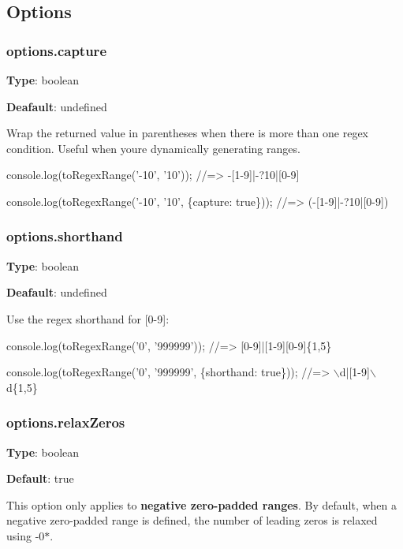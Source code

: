 \subsection*{Options}

\subsubsection*{options.\+capture}

{\bfseries Type}\+: {\ttfamily boolean}

{\bfseries Deafault}\+: {\ttfamily undefined}

Wrap the returned value in parentheses when there is more than one regex condition. Useful when you\textquotesingle{}re dynamically generating ranges.


\begin{DoxyCode}
console.log(toRegexRange('-10', '10'));
//=> -[1-9]|-?10|[0-9]

console.log(toRegexRange('-10', '10', \{capture: true\}));
//=> (-[1-9]|-?10|[0-9])
\end{DoxyCode}


\subsubsection*{options.\+shorthand}

{\bfseries Type}\+: {\ttfamily boolean}

{\bfseries Deafault}\+: {\ttfamily undefined}

Use the regex shorthand for {\ttfamily \mbox{[}0-\/9\mbox{]}}\+:


\begin{DoxyCode}
console.log(toRegexRange('0', '999999'));
//=> [0-9]|[1-9][0-9]\{1,5\}

console.log(toRegexRange('0', '999999', \{shorthand: true\}));
//=> \(\backslash\)d|[1-9]\(\backslash\)d\{1,5\}
\end{DoxyCode}


\subsubsection*{options.\+relax\+Zeros}

{\bfseries Type}\+: {\ttfamily boolean}

{\bfseries Default}\+: {\ttfamily true}

This option only applies to {\bfseries negative zero-\/padded ranges}. By default, when a negative zero-\/padded range is defined, the number of leading zeros is relaxed using {\ttfamily -\/0$\ast$}.


